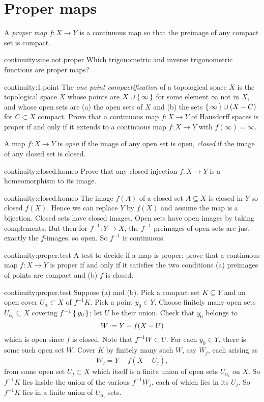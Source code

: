 \section{Proper maps}
A \emph{proper map} \(f \colon X \to Y\) is a continuous map so that the preimage of any compact set is compact.
\begin{problem}{continuity:sine.not.proper}
Which trigonometric and inverse trigonometric functions are proper maps?
\end{problem}
\begin{problem}{continuity:1.point}
The \emph{one point compactification} of a topological space \(X\) is the topological space \(\bar{X}\) whose points are \(X \cup \set{\infty}\) for some element \(\infty\) not in \(X\), and whose open sets are (a) the open sets of \(X\) and (b) the sets \(\set{\infty} \cup (X-C)\) for \(C \subset X\) compact.
Prove that a continuous map \(f \colon X \to Y\) of Hausdorff spaces is proper if and only if it extends to a continuous map \(\bar{f} \colon \bar{X} \to \bar{Y}\) with \(\bar{f}(\infty)=\infty\).
\end{problem}
A map \(f\colon X \to Y\) is \emph{open} if the image of any open set is open, \emph{closed} if the image of any closed set is closed.
\begin{problem}{continuity:closed.homeo}
Prove that any closed injection \(f\colon X\to Y\) is a homeomorphism to its image.
\end{problem}
\begin{answer}{continuity:closed.homeo}
The image \(f(A)\) of a closed set \(A\subseteq X\) is closed in \(Y\) so closed \(f(X)\).
Hence we can replace \(Y\) by \(f(X)\) and assume the map is a bijection.
Closed sets have closed images.
Open sets have open images by taking complements.
But then for \(f^{-1}\colon Y\to X\), the \(f^{-1}\)-preimages of open sets are just exactly the \(f\)-images, so open.
So \(f^{-1}\) is continuous.
\end{answer}
\begin{problem*}{continuity:proper.test}
A test to decide if a map is proper: prove that a continuous map \(f \colon X \to Y\) is proper if and only if it satisfies the two conditions (a) preimages of points are compact and (b) \(f\) is closed.
\end{problem*}
\begin{answer}{continuity:proper.test}
Suppose (a) and (b).
Pick a compact set \(K\subseteq Y\) and an open cover \(U_{\alpha}\subset X\) of \(f^{-1}K\).
Pick a point \(y_0\in Y\).
Choose finitely many open sets \(U_{\alpha_i}\subseteq X\) covering \(f^{-1}\set{y_0}\); let \(U\) be their union.
Check that \(y_0\) belongs to
\[
W\defeq Y-f(X-U)
\]
which is open since \(f\) is closed.
Note that \(f^{-1}W\subset U\).
For each \(y_0\in Y\), there is some such open set \(W\).
Cover \(K\) by finitely many such \(W\), say \(W_j\), each arising as
\[
W_j=Y-f(X-U_j),
\]
from some open set \(U_j\subset X\) which itself is a finite union of open sets \(U_{\alpha_i}\) on \(X\).
So \(f^{-1}K\) lies inside the union of the various \(f^{-1}W_j\), each of which lies in its \(U_j\).
So \(f^{-1}K\) lies in a finite union of \(U_{\alpha_i}\) sets.
\end{answer}
